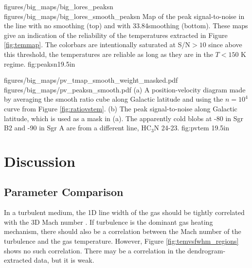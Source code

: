 \RotFigureTwoAA
{figures/big_maps/big_lores_peaksn}
{figures/big_maps/big_lores_smooth_peaksn}
{Map of the peak signal-to-noise in the \para \threeohthree line with no
smoothing (top) and with 33.84\arcsec smoothing (bottom).  
These maps give an indication of the reliability of the temperatures extracted
in Figure \ref{fig:temmap}.  The colorbars are intentionally saturated at
S/N$>10$ since above this threshold, the temperatures are reliable as long as
they are in the $T<150$ K regime.
}
{fig:peaksn}{1}{9.5in}



\RotFigureTwoAA
{figures/big_maps/pv_tmap_smooth_weight_masked.pdf}
{figures/big_maps/pv_peaksn_smooth.pdf}
{(a) A position-velocity diagram made by averaging the smooth ratio cube along
Galactic latitude and using the $n=10^4$ \percc curve from Figure
\ref{fig:ratiovstem}.  (b) The peak signal-to-noise along Galactic latitude,
which is used as a mask in (a).  The apparently cold blobs at -80 \kms in Sgr
B2 and -90 \kms in Sgr A are from a different line, HC$_3$N 24-23.
}
{fig:pvtem}
{1}{9.5in}



\clearpage
\section{Discussion}
\label{sec:discussion}
\subsection{Parameter Comparison}
 In a
turbulent medium, the 1D line width of the gas should be tightly correlated
with the 3D Mach number \citep[e.g.][]{Federrath2011a}.  If turbulence is the
dominant gas heating mechanism, there should also be a correlation between the
Mach number of the turbulence and the gas temperature.  However, Figure
\ref{fig:temvsfwhm_regions} shows no such correlation.  There may be a
correlation in the dendrogram-extracted data, but it is weak.

